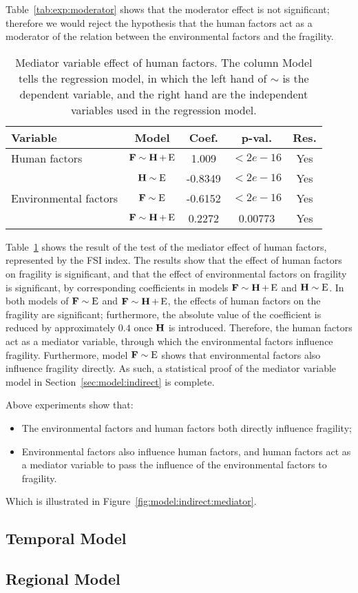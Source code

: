 Table~\ref{tab:exp:moderator} shows that the moderator effect is not significant; therefore we would reject the hypothesis that the human factors act as a moderator of the relation between the environmental factors and the fragility.

\begin{table}[htbp]
    \centering
    \begin{tabular}{|l|cccc|} \hline
        Variable & Model & Coef. & p-val. & Res.  \\ \hline
        Human factors & $\operatorname*{\mathbf{F}}\sim\operatorname*{\mathbf{H}} + \operatorname*{E}$ & 1.009 & $<2e-16$ & Yes  \\ \hline        
        \multirow{3}{*}{Environmental factors} & $\operatorname*{\mathbf{H}}\sim\operatorname*{E}$ & -0.8349 & $<2e-16$ & Yes \\ \cline{2-5}
        & $\operatorname*{\mathbf{F}}\sim\operatorname*{E}$ & -0.6152 & $<2e-16$ & Yes \\ \cline{2-5}
        & $\operatorname*{\mathbf{F}}\sim\operatorname*{\mathbf{H}}+\operatorname*{E}$ & 0.2272 & 0.00773 & Yes \\ \hline        
    \end{tabular}
    \caption{Mediator variable effect of human factors. The column Model tells the regression model, in which the left hand of $\sim$ is the dependent variable, and the right hand are the independent variables used in the regression model.}
    \label{tab:exp:mediator:general}
\end{table}
    
Table~\ref{tab:exp:mediator:general} shows the result of the test of the mediator effect of human factors, represented by the FSI index. The results show that the effect of human factors on fragility is significant, and that the effect of environmental factors on fragility is significant, by corresponding coefficients in models $\operatorname*{\mathbf{F}}\sim\operatorname*{\mathbf{H}}+\operatorname*{E}$ and $\operatorname*{\mathbf{H}}\sim\operatorname*{E}$. In both models of $\operatorname*{\mathbf{F}}\sim\operatorname*{E}$ and $\operatorname*{\mathbf{F}}\sim\operatorname*{\mathbf{H}}+\operatorname*{E}$, the effects of human factors on the fragility are significant; furthermore, the absolute value of the coefficient is reduced by approximately $0.4$ once $\operatorname*{\mathbf{H}}$ is introduced. Therefore, the human factors act as a mediator variable, through which the environmental factors influence fragility. Furthermore, model $\operatorname*{\mathbf{F}}\sim\operatorname*{E}$ shows that environmental factors also influence fragility directly. As such, a statistical proof of the mediator variable model in Section~\ref{sec:model:indirect} is complete.

 Above experiments show that:
\begin{itemize}
   \item The environmental factors and human factors both directly influence fragility;
   \item Environmental factors also influence human factors, and human factors act as a mediator variable to pass the influence of the environmental factors to fragility. 
\end{itemize}
Which is illustrated in Figure~\ref{fig:model:indirect:mediator}. 

\subsection{Temporal Model}
\label{sec:exp:temporal}

\subsection{Regional Model}
\label{sec:exp:regional}